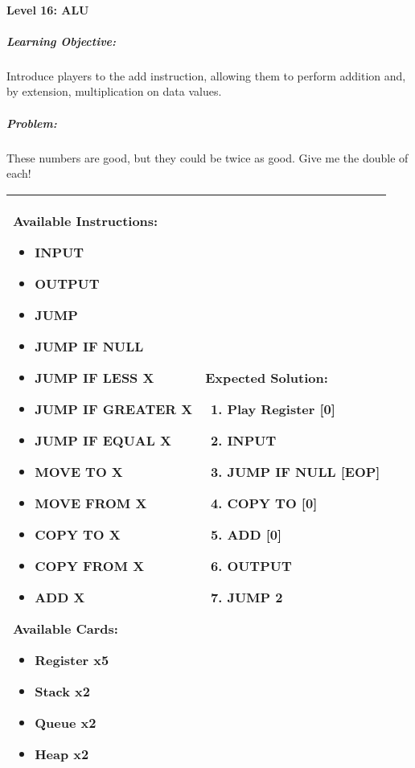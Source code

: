 \paragraph{Level 16: ALU}
\subparagraph{Learning Objective:} Introduce players to the add instruction, allowing them to perform addition and, by extension, multiplication on data values.

\subparagraph{Problem:} These numbers are good, but they could be twice as good. Give me the double of each!

\begin{center}
    \begin{tabular}{ | m{6cm} | m{8cm} | } 
        \hline
            \textbf{Available Instructions:} 
            \begin{itemize}
                \setlength\itemsep{-.35em}
                \item INPUT
                \item OUTPUT
                \item JUMP
                \item JUMP IF NULL
                \item JUMP IF LESS X
                \item JUMP IF GREATER X
		\item JUMP IF EQUAL X
                \item MOVE TO X
                \item MOVE FROM X
                \item COPY TO X
                \item COPY FROM X
		\item ADD X
            \end{itemize}
            \textbf{Available Cards:} 
            \begin{itemize}
                \setlength\itemsep{-.35em}
                \item Register x5
		\item Stack x2
                \item Queue x2
                \item Heap x2
            \end{itemize}& 
            \textbf{Expected Solution:} 
            \begin{enumerate}
                \setlength\itemsep{-.35em}
		\item Play Register [0]
                \item INPUT
		\item JUMP IF NULL [EOP]
		\item COPY TO [0]
		\item ADD [0]
		\item OUTPUT
		\item JUMP 2
            \end{enumerate}
            \\
        \hline
    \end{tabular}
\end{center}


